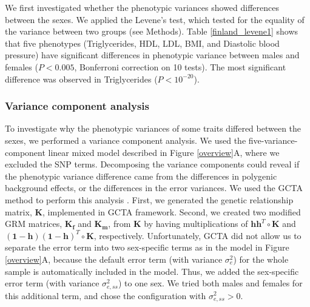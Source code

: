 \documentclass[11pt]{article}
\begin{document}
We first investigated whether the phenotypic variances showed differences between the sexes.
We applied the Levene's test, 
which tested for the equality of the variance between two groups (see Methods).
Table \ref{finland_levene1} shows that five phenotypes (Triglycerides, HDL, LDL, BMI, and Diastolic blood pressure)
have significant differences in phenotypic variance between males and females ($P<0.005$, Bonferroni correction on 10 tests).
The most significant difference was observed in Triglycerides ($P<10^{-20}$).



\subsubsection*{Variance component analysis}

To investigate why the phenotypic variances of some traits differed between the sexes, 
we performed a variance component analysis.
We used the five-variance-component linear mixed model described in Figure \ref{overview}A,
where we excluded the SNP terms.
Decomposing the variance components could reveal if the phenotypic variance difference came from the differences
in polygenic background effects, or the differences in the error variances.
We used the GCTA method to perform this analysis \citep{Yang:NatGenet:2010}.
First, we generated the genetic relationship matrix, $\mathbf{K}$, implemented in GCTA framework.
Second, we created two modified GRM matrices, $\mathbf{K_{f}}$ and $\mathbf{K_{m}}$, from $\mathbf{K}$ by having multiplications of $\mathbf{hh}^T\circ\mathbf{K}$ and $\mathbf{(1-h)(1-h)}^T\circ\mathbf{K}$, respectively.
Unfortunately, GCTA did not allow us to separate the error term into two sex-specific terms as in the model in Figure \ref{overview}A,
because the default error term (with variance $\sigma^2_e$) for the whole sample is automatically included in the model.
Thus, we added the sex-specific error term (with variance $\sigma^2_{e,ss}$) to one sex. 
We tried both males and females for this additional term, and chose the configuration with $\sigma^2_{e,ss}>0$.
\end{document}
